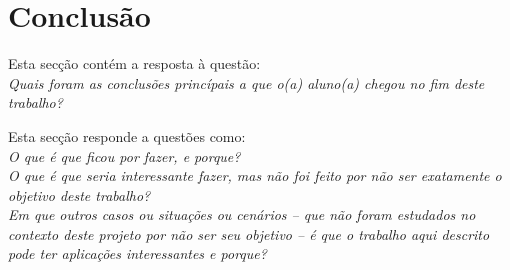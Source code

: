 \chapter*{Conclusão}
\label{chap:conc-trab-futuro}

Esta secção contém a resposta à questão: \\
\emph{Quais foram as conclusões princípais a que o(a) aluno(a) chegou no fim deste trabalho?}

Esta secção responde a questões como:\\
\emph{O que é que ficou por fazer, e porque?}\\
\emph{O que é que seria interessante fazer, mas não foi feito por não ser exatamente o objetivo deste trabalho?}\\
\emph{Em que outros casos ou situações ou cenários -- que não foram estudados no contexto deste projeto por não ser seu objetivo -- é que o trabalho aqui descrito pode ter aplicações interessantes e porque?}